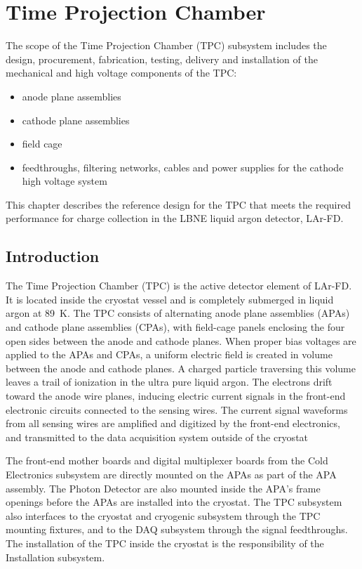 \chapter{Time Projection Chamber}
\label{ch:tpc}

The scope of the Time Projection Chamber (TPC) subsystem includes the design, procurement, fabrication, testing, delivery and installation of the mechanical and high voltage components of the TPC: 
\begin{itemize}
\item anode plane assemblies 
\item cathode plane assemblies
\item field cage
\item feedthroughs, filtering networks, cables and power supplies for the cathode high voltage system
\end{itemize}
This chapter describes the reference design for the TPC that meets the required performance for charge collection in the LBNE liquid argon detector, LAr-FD.

\section{Introduction}

The Time Projection Chamber (TPC) is the active detector element of LAr-FD. It is located inside the cryostat 
vessel and is completely submerged in liquid argon at 89~K. The TPC consists of alternating anode plane assemblies (APAs) and cathode plane assemblies (CPAs), with field-cage panels enclosing the four open sides between the anode and cathode planes.
When proper bias voltages are applied to the APAs and CPAs, a uniform electric field is created in volume between the anode and cathode planes. A charged particle traversing this volume leaves a trail of ionization in the ultra pure liquid argon.  The electrons drift toward the anode wire planes, inducing electric current signals in the front-end electronic circuits connected to the sensing wires.  The current signal waveforms from all sensing wires are amplified and digitized by the front-end electronics, and transmitted to the data acquisition system outside of the cryostat

The front-end mother boards and digital multiplexer boards from the Cold Electronics subsystem are directly mounted on the APAs as part of the APA assembly.  The Photon Detector are also mounted inside the APA's frame openings before the APAs are installed into the cryostat. The TPC subsystem also interfaces to the cryostat and cryogenic subsystem through the TPC mounting fixtures, and to the DAQ subsystem through the signal feedthroughs.  The installation of the TPC inside the cryostat is the responsibility of the Installation subsystem.

